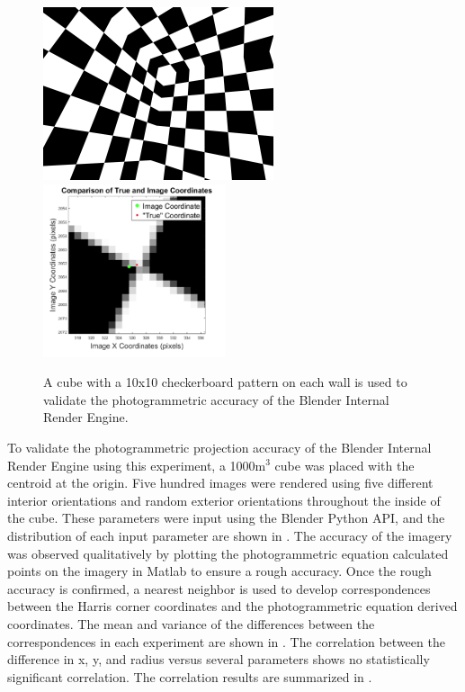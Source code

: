 \begin{figure}[H]
	\centering
	\includegraphics[height = 2in]{../fig/checkerRoom}
	\includegraphics[height = 2in]{../fig/dPixZoom}
	\caption{A cube with a 10x10 checkerboard pattern on each wall is used to validate the photogrammetric accuracy of the Blender Internal Render Engine.}
	\label{fig:checker}
\end{figure}

To validate the photogrammetric projection accuracy of the Blender Internal Render Engine using this experiment, a 1000m$^3$ cube was placed with the centroid at the origin.  Five hundred images were rendered using five different interior orientations and random exterior orientations throughout the inside of the cube.  These parameters were input using the Blender Python API, and the distribution of each input parameter are shown in .  The accuracy of the imagery was observed qualitatively by plotting the photogrammetric equation calculated points on the imagery in Matlab to ensure a rough accuracy.  Once the rough accuracy is confirmed, a nearest neighbor is used to develop correspondences between the Harris corner coordinates and the photogrammetric equation derived coordinates.  The mean and variance of the differences between the correspondences in each experiment are shown in .  The correlation between the difference in x, y, and radius versus several parameters shows no statistically significant correlation.  The correlation results are summarized in .

